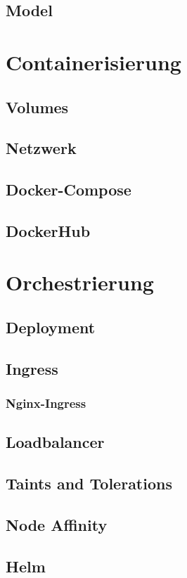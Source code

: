 \subsection{Model}

\section{Containerisierung}
\subsection{Volumes}
\subsection{Netzwerk}
\subsection{Docker-Compose}
\subsection{DockerHub}

\section{Orchestrierung}
\subsection{Deployment}
\subsection{Ingress}
\subsubsection{Nginx-Ingress}
\subsection{Loadbalancer}
\subsection{Taints and Tolerations}
\subsection{Node Affinity}
\subsection{Helm}




